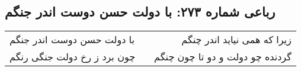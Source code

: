 \begin{center}
\section*{رباعی شماره ۲۷۳: با دولت حسن دوست اندر جنگم}
\label{sec:sh273}
\begin{longtable}{l p{0.5cm} r}
با دولت حسن دوست اندر جنگم
&&
زیرا که همی نیاید اندر چنگم
\\
چون برد ز رخ دولت جنگی رنگم
&&
گردنده چو دولت و دو تا چون چنگم
\\
\end{longtable}
\end{center}
